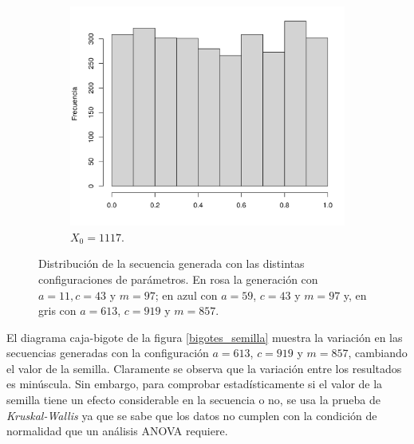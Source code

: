 \documentclass[12pt]{article}
\begin{document}
\begin{figure}
\begin{subfigure}{\textwidth}
			\includegraphics[scale=0.34]{hist_1117-613-919-857.png}
			\caption{$X_0 = 1117$.}
			\label{semilla1117}
		\end{subfigure}
		\caption{Distribución de la secuencia generada con las distintas configuraciones de parámetros. En rosa la generación con $a=11, c= 43$ y $m=97$; en azul con $a=59$, $c= 43$ y $m=97$ y, en gris con $a=613$, $c= 919$ y $m=857$.}
		\label{varia_semilla}
	\end{figure}

	El diagrama caja-bigote de la figura \ref{bigotes_semilla} muestra la variación en las secuencias generadas con la configuración $a=613$, $c= 919$ y $m=857$, cambiando el valor de la semilla. Claramente se observa que la variación entre los resultados es minúscula. Sin embargo, para comprobar estadísticamente si el valor de la semilla tiene un efecto considerable en la secuencia o no, se usa la prueba de {\em Kruskal-Wallis} \cite{kruskal_test} ya que se sabe que los datos no cumplen con la condición de normalidad que un análisis ANOVA requiere. 
	
\end{document}
